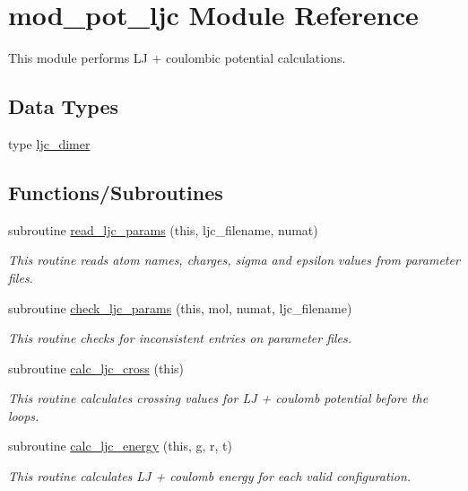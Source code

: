 \hypertarget{namespacemod__pot__ljc}{}\section{mod\+\_\+pot\+\_\+ljc Module Reference}
\label{namespacemod__pot__ljc}


This module performs LJ + coulombic potential calculations.  


\subsection*{Data Types}
\begin{DoxyCompactItemize}
\item 
type \hyperlink{structmod__pot__ljc_1_1ljc__dimer}{ljc\+\_\+dimer}
\end{DoxyCompactItemize}
\subsection*{Functions/\+Subroutines}
\begin{DoxyCompactItemize}
\item 
subroutine \hyperlink{namespacemod__pot__ljc_aba75dd17c928cdddf564bf03d18b3ee2}{read\+\_\+ljc\+\_\+params} (this, ljc\+\_\+filename, numat)
\begin{DoxyCompactList}\small\item\em This routine reads atom names, charges, sigma and epsilon values from parameter files. \end{DoxyCompactList}\item 
subroutine \hyperlink{namespacemod__pot__ljc_a1bb4a9e2007633f78e818f7f1d8347b5}{check\+\_\+ljc\+\_\+params} (this, mol, numat, ljc\+\_\+filename)
\begin{DoxyCompactList}\small\item\em This routine checks for inconsistent entries on parameter files. \end{DoxyCompactList}\item 
subroutine \hyperlink{namespacemod__pot__ljc_aea69edf70ec804ebb8075741c84ab50b}{calc\+\_\+ljc\+\_\+cross} (this)
\begin{DoxyCompactList}\small\item\em This routine calculates crossing values for LJ + coulomb potential before the loops. \end{DoxyCompactList}\item 
subroutine \hyperlink{namespacemod__pot__ljc_ab48e8b4489ee4bd72910cbed5e760a42}{calc\+\_\+ljc\+\_\+energy} (this, g, r, t)
\begin{DoxyCompactList}\small\item\em This routine calculates LJ + coulomb energy for each valid configuration. \end{DoxyCompactList}\end{DoxyCompactItemize}
